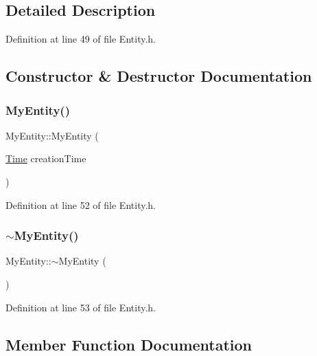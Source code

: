 \subsection{Detailed Description}


Definition at line 49 of file Entity.\+h.



\subsection{Constructor \& Destructor Documentation}
\mbox{\label{class_my_entity_a2ef0bc770ce958c4f51c453e870d3478}} 
\subsubsection{\texorpdfstring{My\+Entity()}{MyEntity()}}
{\footnotesize\ttfamily My\+Entity\+::\+My\+Entity (\begin{DoxyParamCaption}\item[{\hyperlink{_simulation_executive_8h_ac2d3e0ba793497bcca555c7c2cf64ff3}{Time}}]{creation\+Time }\end{DoxyParamCaption})\hspace{0.3cm}{\ttfamily [inline]}}



Definition at line 52 of file Entity.\+h.

\mbox{\label{class_my_entity_ac575adbb2632db8db827e9453998b611}} 
\subsubsection{\texorpdfstring{$\sim$\+My\+Entity()}{~MyEntity()}}
{\footnotesize\ttfamily My\+Entity\+::$\sim$\+My\+Entity (\begin{DoxyParamCaption}{ }\end{DoxyParamCaption})\hspace{0.3cm}{\ttfamily [inline]}}



Definition at line 53 of file Entity.\+h.



\subsection{Member Function Documentation}
\mbox{\label{class_my_entity_acc29e753a0df1928eb4c9e627d65a3b3}} 
